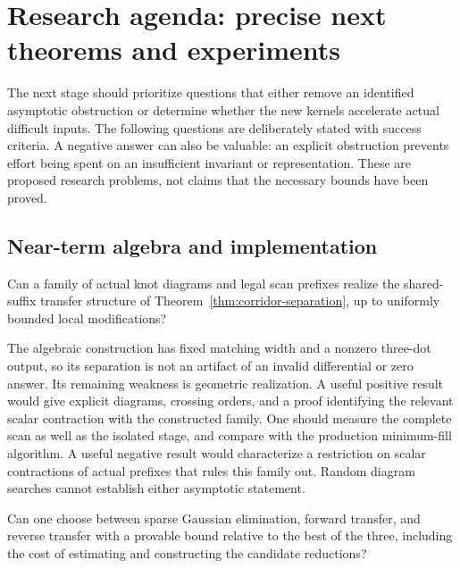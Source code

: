 \section{Research agenda: precise next theorems and experiments}
\label{sec:research}

The next stage should prioritize questions that either remove an identified
asymptotic obstruction or determine whether the new kernels accelerate
actual difficult inputs. The following questions are deliberately stated
with success criteria. A negative answer can also be valuable: an explicit
obstruction prevents effort being spent on an insufficient invariant or
representation. These are proposed research problems, not claims that the
necessary bounds have been proved.

\subsection{Near-term algebra and implementation}

\begin{researchquestion}
Can a family of actual knot diagrams and legal scan prefixes realize the
shared-suffix transfer structure of Theorem~\ref{thm:corridor-separation},
up to uniformly bounded local modifications?
\end{researchquestion}

The algebraic construction has fixed matching width and a nonzero
three-dot output, so its separation is not an artifact of an invalid
differential or zero answer. Its remaining weakness is geometric
realization. A useful positive result would give explicit diagrams,
crossing orders, and a proof identifying the relevant scalar contraction
with the constructed family. One should measure the complete scan as well
as the isolated stage, and compare with the production minimum-fill
algorithm. A useful negative result would characterize a restriction on
scalar contractions of actual prefixes that rules this family out. Random
diagram searches cannot establish either asymptotic statement.

\begin{researchquestion}
Can one choose between sparse Gaussian elimination, forward transfer, and
reverse transfer with a provable bound relative to the best of the three,
including the cost of estimating and constructing the candidate reductions?
\end{researchquestion}

